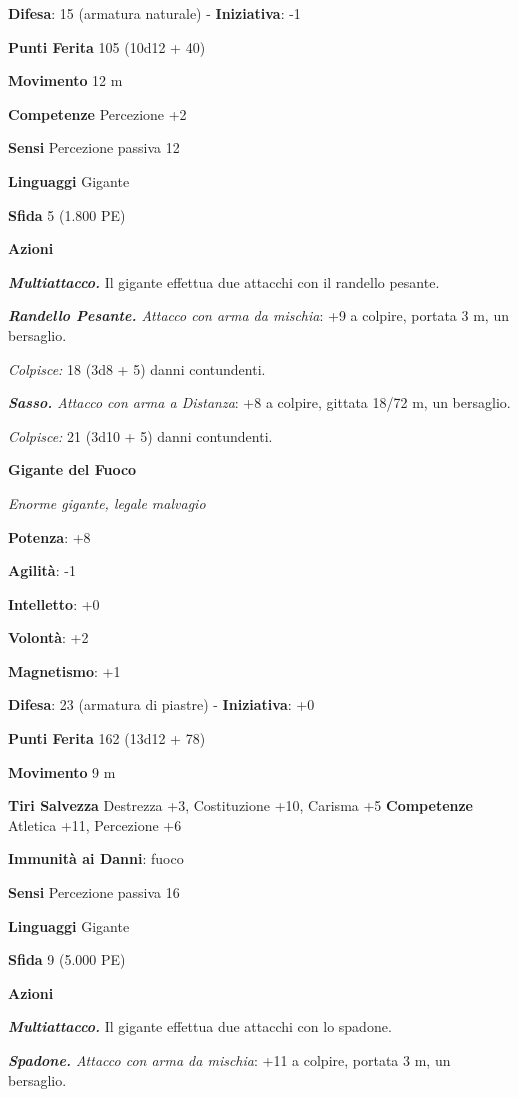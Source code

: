 \begin{multicols}{2}
\textbf{Difesa}: 15 (armatura naturale) - \textbf{Iniziativa}: -1

\textbf{Punti Ferita} 105 (10d12 + 40)

\textbf{Movimento} 12 m

\textbf{Competenze} Percezione +2

\textbf{Sensi} Percezione passiva 12

\textbf{Linguaggi} Gigante

\textbf{Sfida} 5 (1.800 PE)\smallskip

\smallskip\textbf{Azioni}

\emph{\textbf{Multiattacco.}} Il gigante effettua due attacchi con il
randello pesante.

\emph{\textbf{Randello Pesante.} Attacco con arma da mischia}: +9 a
colpire, portata 3 m, un bersaglio.

\emph{Colpisce:} 18 (3d8 + 5) danni contundenti.

\emph{\textbf{Sasso.} Attacco con arma a Distanza}: +8 a colpire,
gittata 18/72 m, un bersaglio.

\emph{Colpisce:} 21 (3d10 + 5) danni contundenti.

\textbf{Gigante del Fuoco}

\emph{Enorme gigante, legale malvagio}

\textbf{Potenza}: +8

\textbf{Agilità}: -1

\textbf{Intelletto}: +0

\textbf{Volontà}: +2

\textbf{Magnetismo}: +1

\textbf{Difesa}: 23 (armatura di piastre) - \textbf{Iniziativa}: +0

\textbf{Punti Ferita} 162 (13d12 + 78)

\textbf{Movimento} 9 m

\textbf{Tiri Salvezza} Destrezza +3, Costituzione +10, Carisma +5
\textbf{Competenze} Atletica +11, Percezione +6

\textbf{Immunità ai Danni}: fuoco

\textbf{Sensi} Percezione passiva 16

\textbf{Linguaggi} Gigante

\textbf{Sfida} 9 (5.000 PE)\smallskip

\smallskip\textbf{Azioni}

\emph{\textbf{Multiattacco.}} Il gigante effettua due attacchi con lo
spadone.

\emph{\textbf{Spadone.} Attacco con arma da mischia}: +11 a colpire,
portata 3 m, un bersaglio.


\end{multicols}
